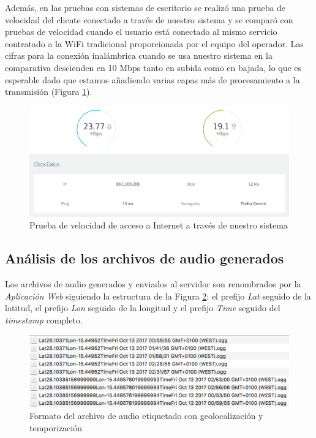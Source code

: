 Además, en las pruebas con sistemas de escritorio se realizó una prueba de velocidad del cliente conectado a través de nuestro sistema y se comparó con pruebas de velocidad cuando el usuario está conectado al mismo servicio contratado a la WiFi tradicional proporcionada por el equipo del operador. Las cifras para la conexión inalámbrica cuando se usa nuestro sistema en la comparativa descienden en 10 Mbps tanto en subida como en bajada, lo que es esperable dado que estamos añadiendo varias capas más de procesamiento a la transmisión (Figura \ref{speed}).

\begin{figure}[!t]
\begin{center}
\includegraphics[width=0.75\linewidth]{./6_EvalEmpirica/Img/speed.png}
\end{center}
\caption{Prueba de velocidad de acceso a Internet a través de nuestro sistema}
\label{speed}
\end{figure}

\subsection{Análisis de los archivos de audio generados}
Los archivos de audio generados y enviados al servidor son renombrados por la \emph{Aplicación Web} siguiendo la estructura de la Figura \ref{audioFiles}: el prefijo \emph{Lat} seguido de la latitud, el prefijo \emph{Lon} seguido de la longitud y el prefijo \emph{Time} seguido del \emph{timestamp} completo.

\begin{figure}[!t]
\begin{center}
\includegraphics[width=0.75\linewidth]{./6_EvalEmpirica/Img/audioFiles.png}
\end{center}
\caption{Formato del archivo de audio etiquetado con geolocalización y temporización}
\label{audioFiles}
\end{figure}

